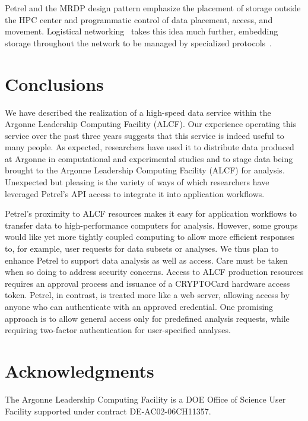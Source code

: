 \documentclass[sigconf]{acmart}
\begin{document}
Petrel and the MRDP design pattern emphasize the placement of storage outside the HPC
center and programmatic control of data placement, 
access, and movement.
Logistical networking~\cite{beck2000logistical} takes this idea much further,
embedding storage throughout the network to be managed by specialized protocols~\cite{beck2002end}. 


\section{Conclusions}

We have described the realization of a high-speed data service within the Argonne 
Leadership Computing Facility (ALCF).
Our experience operating this service over the past three years suggests that this service
is indeed useful to many people.
As expected, researchers have used it to distribute data produced at Argonne in
computational and experimental 
studies and to stage data being brought to the Argonne Leadership Computing Facility (ALCF) for analysis.
Unexpected but pleasing is the variety of ways of which researchers have leveraged Petrel's API access to
integrate it into application
workflows.

Petrel's proximity to ALCF resources makes it easy for application workflows to transfer data to
high-performance computers for analysis.
However, some groups would like yet more tightly coupled computing to allow more efficient
responses to, for example, user requests for data subsets or analyses. 
We thus plan to enhance Petrel to support data analysis as well as access.
Care must be taken when so doing to address security concerns. 
Access to ALCF production resources requires an approval process and issuance of a
CRYPTOCard hardware access token.
Petrel, in contrast, is treated more like a web server, allowing access by anyone who can authenticate
with an approved credential.
One promising approach is to allow general access only for predefined analysis requests,
while requiring two-factor authentication for user-specified analyses.

\section*{Acknowledgments}

The Argonne Leadership Computing Facility is a DOE Office of Science User Facility supported under contract DE-AC02-06CH11357.



 
\end{document}
